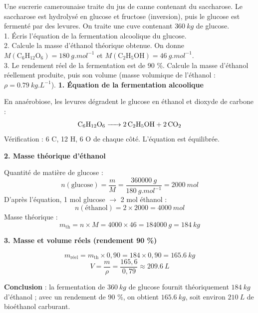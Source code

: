 \documentclass[11pt]{article}
\begin{document}
\begin{exoresolu}
Une sucrerie camerounaise traite du jus de canne contenant du saccharose. Le saccharose est hydrolysé en glucose et fructose (inversion), puis le glucose est fermenté par des levures. On traite une cuve contenant $\SI{360}{kg}$ de glucose.\\
1. Écris l'équation de la fermentation alcoolique du glucose.\\
2. Calcule la masse d'éthanol théorique obtenue. On donne $M(\mathrm{C_6H_{12}O_6}) = \SI{180}{g.mol^{-1}}$ et $M(\mathrm{C_2H_5OH}) = \SI{46}{g.mol^{-1}}$.\\
3. Le rendement réel de la fermentation est de 90 \%. Calcule la masse d'éthanol réellement produite, puis son volume (masse volumique de l'éthanol : $\rho = \SI{0,79}{kg.L^{-1}}$).
\tcblower
\textbf{1. Équation de la fermentation alcoolique}

En anaérobiose, les levures dégradent le glucose en éthanol et dioxyde de carbone :
\[ \ce{C6H12O6 -> 2 C2H5OH + 2 CO2} \]
Vérification : 6 C, 12 H, 6 O de chaque côté. L'équation est équilibrée.

\textbf{2. Masse théorique d'éthanol}

Quantité de matière de glucose :
\[ n(\text{glucose}) = \dfrac{m}{M} = \dfrac{\SI{360000}{g}}{\SI{180}{g.mol^{-1}}} = \SI{2000}{mol} \]
D'après l'équation, 1 mol glucose $\rightarrow$ 2 mol éthanol :
\[ n(\text{éthanol}) = 2 \times 2000 = \SI{4000}{mol} \]
Masse théorique :
\[ m_{\text{th}} = n \times M = 4000 \times 46 = \SI{184000}{g} = \SI{184}{kg} \]

\textbf{3. Masse et volume réels (rendement 90 \%)}

\[ m_{\text{réel}} = m_{\text{th}} \times 0,90 = 184 \times 0,90 = \SI{165,6}{kg} \]
\[ V = \dfrac{m}{\rho} = \dfrac{165,6}{0,79} \approx \SI{209,6}{L} \]

\textbf{Conclusion} : la fermentation de $\SI{360}{kg}$ de glucose fournit théoriquement $\SI{184}{kg}$ d'éthanol ; avec un rendement de 90 \%, on obtient $\SI{165,6}{kg}$, soit environ $\SI{210}{L}$ de bioéthanol carburant.
\end{exoresolu}
\end{document}
